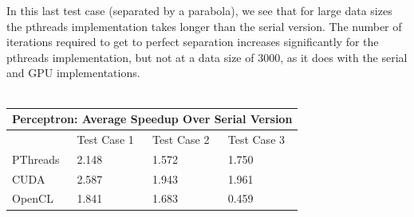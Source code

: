 \documentclass{article}
\begin{document}
In this last test case (separated by a parabola), we see that for large data sizes the pthreads implementation takes longer than the serial version. The number of iterations required to get to perfect separation increases significantly for the pthreads implementation, but not at a data size of 3000, as it does with the serial and GPU implementations.
\\ \\
\begin{tabular}{ |p{3cm}||p{3cm}|p{3cm}|p{3cm}|  }
 \hline
 \multicolumn{4}{|c|}{Perceptron: Average Speedup Over Serial Version} \\
 \hline
 & Test Case 1 & Test Case 2 & Test Case 3\\
 \hline
 PThreads & 2.148 & 1.572 & 1.750\\
 CUDA & 2.587 & 1.943 & 1.961\\
 OpenCL & 1.841 & 1.683 & 0.459\\
 \hline
\end{tabular}
\clearpage
\end{document}
